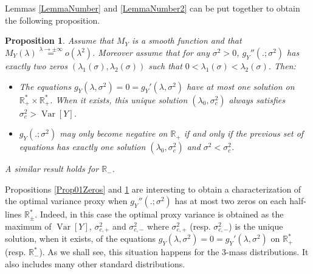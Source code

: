 \documentclass[a4paper, 10pt]{article}
\newtheorem{proposition}{Proposition}[section]
\newtheorem{lemma}{Lemma}[section]
\theoremstyle{definition}
\begin{document}
Lemmas \ref{LemmaNumber} and \ref{LemmaNumber2} can be put together to obtain the following proposition.

\begin{proposition}\label{LemmaMerged}Assume that $M_Y$ is a smooth function and that $M_Y(\lambda)\overset{\lambda\to \pm\infty}{=}o(\lambda^2)$. Moreover assume that for any $\sigma^2>0$, $g_Y''(.;\sigma^2)$ has exactly two zeros $(\lambda_1(\sigma),\lambda_2(\sigma))$ such that $0<\lambda_1(\sigma)<\lambda_2(\sigma)$. Then:
\begin{itemize}
    \item The equations $g_Y(\lambda,\sigma^2)=0=g_Y'(\lambda,\sigma^2)$ have at most one solution on $\mathbb{R}_+^*\times  \mathbb{R}_+^*$. When it exists, this unique solution $(\lambda_0,\sigma_c^2)$ always satisfies $\sigma_c^2>\operatorname{Var}[Y]$.
    \item $g_Y(.;\sigma^2)$ may only become negative on $\mathbb{R}_+$ if and only if the previous set of equations has exactly one solution $(\lambda_0,\sigma_c^2)$  and $\sigma^2< \sigma_c^2$.
\end{itemize}
A similar result holds for $\mathbb{R}_-$.
\end{proposition}

Propositions \ref{Prop01Zeros} and \ref{LemmaMerged} are interesting to obtain a characterization of the optimal variance proxy when $g_Y''(.;\sigma^2)$ has at most two zeros on each half-lines $\mathbb{R}_\pm^*$. Indeed, in this case the optimal proxy variance is obtained as the maximum of $\operatorname{Var}[Y]$, $\sigma_{c,+}^2$ and $\sigma_{c,-}^2$ where $\sigma_{c,+}^2$ (resp. $\sigma_{c,-}^2$) is the unique solution, when it exists, of the equations $g_Y(\lambda,\sigma^2)=0=g_Y'(\lambda,\sigma^2)$ on $\mathbb{R}_+^*$ (resp. $\mathbb{R}_-^*$). As we shall see, this situation happens for the $3$-mass distributions. It also includes many other standard distributions.

\end{document}
